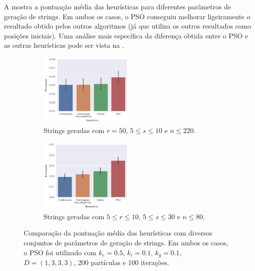     A  mostra a pontuação média das heurísticas para diferentes parâmetros de geração de strings. Em ambos os casos, o PSO conseguiu melhorar ligeiramente o resultado obtido pelos outros algoritmos (já que utiliza os outros resultados como posições iniciais). Uma análise mais específica da diferença obtida entre o PSO e as outras heurísticas pode ser vista na .
    
    \begin{figure}[htb]
        \centering
        \begin{subfigure}[b]{\textwidth}
            \centering
            \includegraphics[width=0.5\textwidth]{images/r50-s-5-10-n220-ke0.5-ki0.1-kg0.1-dist1-3-3-3-iter100-part200.pdf}
            \caption{Strings geradas com $r = 50$, $5 \leq s \leq 10$ e $n \leq 220$.}
            \vspace{12pt}
        \end{subfigure}
        \begin{subfigure}[b]{\textwidth}
            \centering
            \includegraphics[width=0.5\textwidth]{images/r-5-10-s-5-30-n80-ke0.5-ki0.1-kg0.1-dist1-3-3-3-iter100-part200.pdf}
            \caption{Strings geradas com $5 \leq r \leq 10$, $5 \leq s \leq 30$ e $n \leq 80$.}
            \vspace{12pt}
        \end{subfigure}
        \caption{Comparação da pontuação média das heurísticas com diversos conjuntos de parâmetros de geração de strings. Em ambos os casos, o PSO foi utilizado com $k_e = 0.5$, $k_i = 0.1$, $k_g = 0.1$, $D = (1, 3, 3, 3)$, 200 partículas e 100 iterações.}
        \label{fig:comparacao-pontuacao}
    \end{figure}


